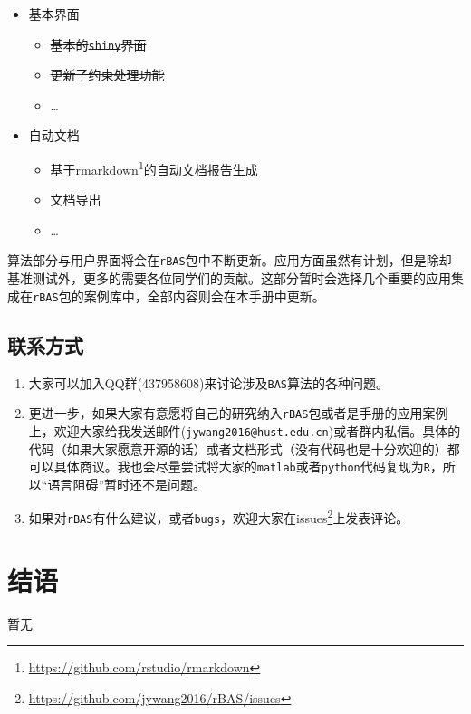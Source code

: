 \documentclass[]{ctexbook}
\providecommand{\tightlist}{%
  \setlength{\itemsep}{0pt}\setlength{\parskip}{0pt}}
\renewcommand{\href}[2]{#2\footnote{\url{#1}}}
\begin{document}
\begin{itemize}
\tightlist
\item
  基本界面

  \begin{itemize}
  \tightlist
  \item
    \sout{基本的\texttt{shiny}界面}
  \item
    \sout{更新了约束处理功能}
  \item
    \ldots{}
  \end{itemize}
\item
  自动文档

  \begin{itemize}
  \tightlist
  \item
    基于\href{https://github.com/rstudio/rmarkdown}{rmarkdown}的自动文档报告生成
  \item
    文档导出
  \item
    \ldots{}
  \end{itemize}
\end{itemize}

算法部分与用户界面将会在\texttt{rBAS}包中不断更新。应用方面虽然有计划，但是除却基准测试外，更多的需要各位同学们的贡献。这部分暂时会选择几个重要的应用集成在\texttt{rBAS}包的案例库中，全部内容则会在本手册中更新。

\section{联系方式}

\begin{enumerate}
\def\labelenumi{\arabic{enumi}.}
\item
  大家可以加入QQ群(437958608)来讨论涉及\texttt{BAS}算法的各种问题。
\item
  更进一步，如果大家有意愿将自己的研究纳入\texttt{rBAS}包或者是手册的应用案例上，欢迎大家给我发送邮件(\texttt{jywang2016@hust.edu.cn})或者群内私信。具体的代码（如果大家愿意开源的话）或者文档形式（没有代码也是十分欢迎的）都可以具体商议。我也会尽量尝试将大家的\texttt{matlab}或者\texttt{python}代码复现为\texttt{R}，所以``语言阻碍''暂时还不是问题。
\item
  如果对\texttt{rBAS}有什么建议，或者\texttt{bugs}，欢迎大家在\href{https://github.com/jywang2016/rBAS/issues}{issues}上发表评论。
\end{enumerate}

\cleardoublepage 

\appendix {}


\chapter*{结语}


暂无



\backmatter
\printindex
\end{document}
